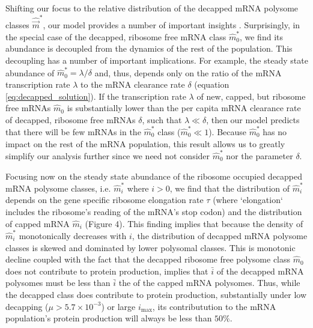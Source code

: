 \documentclass[a4,center,fleqn,nocrop]{NAR}
\newcommand{\imax}{\ensuremath{{i_{\max}}}\xspace}
\newcommand{\mhat}{\ensuremath{\hat{m}}\xspace}
\newcommand{\mvec}{\ensuremath{\vec{m}}\xspace}
\newcommand{\mvechat}{\ensuremath{\hat{\mvec}}\xspace}
\newcommand{\mvechatstar}{\ensuremath{\mvechat^*}\xspace}
\newcommand{\MRL}{\ensuremath{\bar{i}}\xspace}
\begin{document}
Shifting our focus to the relative distribution of the decapped mRNA polysome classes \mvechatstar, our model provides a number of important insights .
Surprisingly, in the special case of the decapped, ribosome free mRNA class $\mhat_0^*$, we find its abundance is decoupled from the dynamics of the rest of the population.
  This decoupling has a number of important implications.
  For example, the steady state abundance of $\mhat_0^* = \lambda/\delta$ and, thus, depends only on the ratio of the mRNA transcription rate $\lambda$ to the mRNA clearance rate $\delta$ (equation \ref{eq:decapped_solution}).
  If the transcription rate $\lambda$ of new, capped, but ribosome free mRNAs $\mhat_0$ is substantially lower than the per capita mRNA clearance rate of decapped, ribosome free mRNAs $\delta$, such that  $\lambda \ll \delta$, then our model predicts that there will be few mRNAs in the $\mhat_0^*$ class ($\mhat_0^* \ll 1$).
  Because $\mhat^*_0$ has no impact on the rest of the mRNA population, this result allows us to greatly simplify our analysis further since we need not consider $\mhat_0^*$ nor the parameter $\delta$.

Focusing now on the steady state abundance of the ribosome occupied decapped mRNA polysome classes, i.e.  $\mhat_i^*$ where $i > 0$, we find that the distribution of $\mhat^*_i$  depends on the gene specific ribosome elongation rate $\tau$ (where `elongation`  includes the ribosome's reading of the mRNA's stop codon) and the distribution of capped mRNA $\mhat_i$ (Figure 4).
\label{item:protein_production} This finding implies that because the density of $\mhat^*_i$ monotonically decreases with $i$, the distribution of decapped mRNA polysome classes is skewed and dominated by lower polysomal classes.
  This is monotonic decline coupled with the fact that the decapped ribosome free polysome class $\mhat_0$ does not contribute to protein production, implies that \MRL of the decapped mRNA polysomes must be less than \MRL the of the capped mRNA polysomes.
  Thus, while the decapped class does contribute to protein production, substantially under low decapping ($\mu> 5.7 \times 10^{-3}$) or large \imax, its contributution to the mRNA population's protein production will always be less than  $50\%$.
\end{document}
